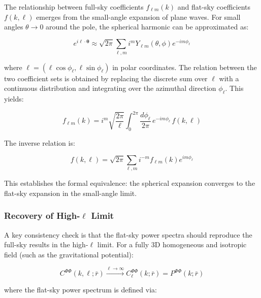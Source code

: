 The relationship between full-sky coefficients $f_{\ell m}(k)$ and flat-sky coefficients $f(k, \boldsymbol{\ell})$ emerges from the small-angle expansion of plane waves. For small angles $\theta \to 0$ around the pole, the spherical harmonic can be approximated as:

\begin{equation}
e^{i\boldsymbol{\ell} \cdot \boldsymbol{\theta}} \approx \sqrt{2\pi} \sum_{\ell, m} i^m Y_{\ell m}(\theta, \phi) e^{-im\phi_\ell}
\label{eq:small_angle_approx}
\end{equation}

where $\boldsymbol{\ell} = (\ell \cos\phi_\ell, \ell \sin\phi_\ell)$ in polar coordinates. The relation between the two coefficient sets is obtained by replacing the discrete sum over $\ell$ with a continuous distribution and integrating over the azimuthal direction $\phi_\ell$. This yields:

\begin{equation}
f_{\ell m}(k) = i^m \sqrt{\frac{2\pi}{\ell}} \int_0^{2\pi} \frac{d\phi_\ell}{2\pi} \, e^{-im\phi_\ell} \, f(k, \boldsymbol{\ell})
\label{eq:full_to_flat_relation}
\end{equation}

The inverse relation is:

\begin{equation}
f(k, \boldsymbol{\ell}) = \sqrt{2\pi} \sum_{\ell, m} i^{-m} f_{\ell m}(k) e^{im\phi_\ell}
\label{eq:flat_to_full_relation}
\end{equation}

This establishes the formal equivalence: the spherical expansion converges to the flat-sky expansion in the small-angle limit.

\subsubsection{Recovery of High-$\ell$ Limit}

A key consistency check is that the flat-sky power spectra should reproduce the full-sky results in the high-$\ell$ limit. For a fully 3D homogeneous and isotropic field (such as the gravitational potential):

\begin{equation}
C^{\Phi\Phi}(k, \ell; \bar{r}) \xrightarrow{\ell \to \infty} C_\ell^{\Phi\Phi}(k; \bar{r}) = P^{\Phi\Phi}(k; \bar{r})
\label{eq:high_ell_full_iso}
\end{equation}

where the flat-sky power spectrum is defined via:


